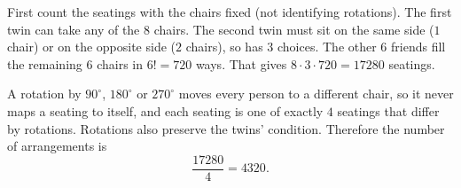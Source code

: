 First count the seatings with the chairs fixed (not identifying rotations). The first twin can take any of the $8$ chairs. The second twin must sit on the same side ($1$ chair) or on the opposite side ($2$ chairs), so has $3$ choices. The other $6$ friends fill the remaining $6$ chairs in $6!=720$ ways. That gives $8\cdot3\cdot720=17280$ seatings.

A rotation by $90^\circ$, $180^\circ$ or $270^\circ$ moves every person to a different chair, so it never maps a seating to itself, and each seating is one of exactly $4$ seatings that differ by rotations. Rotations also preserve the twins' condition. Therefore the number of arrangements is
\[\dfrac{17280}{4}=\boxed{4320}.\]

